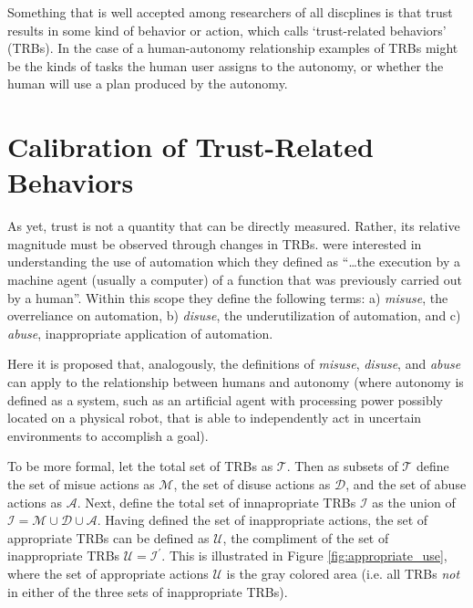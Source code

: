     Something that is well accepted among researchers of all discplines is that trust results in some kind of behavior or action, which \citet{McKnight2001-fa} calls `trust-related behaviors' (TRBs). In the case of a human-autonomy relationship examples of TRBs might be the kinds of tasks the human user assigns to the autonomy, or whether the human will use a plan produced by the autonomy.

\section{Calibration of Trust-Related Behaviors}
    As yet, trust is not a quantity that can be directly measured. Rather, its relative magnitude must be observed through changes in TRBs. \citet{Parasuraman1997-co} were interested in understanding the use of automation which they defined as ``\ldots the execution by a machine agent (usually a computer) of a function that was previously carried out by a human''. Within this scope they define the following terms: a) \emph{misuse}, the overreliance on automation, b) \emph{disuse}, the underutilization of automation, and c) \emph{abuse}, inappropriate application of automation.

    Here it is proposed that, analogously, the definitions of \emph{misuse}, \emph{disuse}, and \emph{abuse} can apply to the relationship between humans and autonomy (where autonomy is defined as a system, such as an artificial agent with processing power possibly located on a physical robot, that is able to independently act in uncertain environments to accomplish a goal).
    
    To be more formal, let the total set of TRBs as $\mathcal{T}$. Then as subsets of $\mathcal{T}$ define the set of misue actions as $\mathcal{M}$, the set of disuse actions as $\mathcal{D}$, and the set of abuse actions as $\mathcal{A}$. Next, define the total set of innapropriate TRBs $\mathcal{I}$ as the union of $\mathcal{I} = \mathcal{M}\cup \mathcal{D}\cup\mathcal{A}$. Having defined the set of inappropriate actions, the set of appropriate TRBs can be defined as $\mathcal{U}$, the compliment of the set of inappropriate TRBs $\mathcal{U} = \mathcal{I}^\prime$. This is illustrated in Figure \ref{fig:appropriate_use}, where the set of appropriate actions $\mathcal{U}$ is the gray colored area (i.e. all TRBs \emph{not} in either of the three sets of inappropriate TRBs).
    
